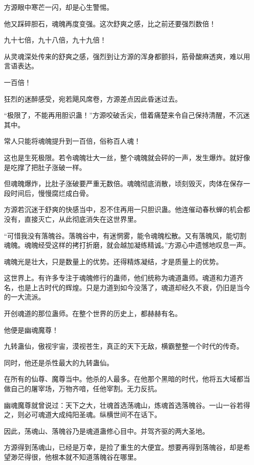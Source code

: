 \begin{this_body}
方源眼中寒芒一闪，却是心生警惕。

他又踩碎胆石，魂魄再度变强。这次舒爽之感，比之前还要强烈数倍！

九十七倍，九十八倍，九十九倍！

从灵魂深处传来的舒爽之感，强烈到让方源的浑身都颤抖，筋骨酸麻透爽，难以用言语表达。

一百倍！

狂烈的迷醉感受，宛若飓风席卷，方源差点因此昏迷过去。

“极限了，不能再用胆识蛊！”方源咬破舌尖，借着痛楚来令自己保持清醒，不沉迷其中。

常人只能将魂魄提升到一百倍，俗称百人魂！

这也是生死极限。若令魂魄壮大一丝，整个魂魄就会砰的一声，发生爆炸。就好像是吃撑了把肚子涨破一样。

但魂魄爆炸，比肚子涨破要严重无数倍。魂魄彻底消散，顷刻毁灭，肉体在保存一段时间后，慢慢腐烂成白骨。

方源若沉迷于舒爽的快感当中，忍不住再用一只胆识蛊。他连催动春秋蝉的机会都没有，直接灭亡，从此彻底消失在这世界里。

“可惜我没有落魄谷。落魄谷中，有迷惘雾，能令魂魄松散。又有落魄风，能切割魂魄。魂魄经受这样的拷打折磨，就会越加凝练精诚。”方源心中遗憾地叹息一声。

魂魄光是壮大，只是数量上的优势。还得精炼凝结，才是质量上的优势。

这世界上。有许多专注于魂魄修行的蛊师，他们统称为魂道蛊师。魂道和力道齐名，也是上古时代的辉煌。只是力道到如今没落了，魂道却经久不衰，仍旧是当今的一大流派。

开创魂道的那位蛊师。在整个世界的历史上，都赫赫有名。

他便是幽魂魔尊！

九转蛊仙，傲视宇宙，漠视苍生，真正的天下无敌，横霸整整一个时代的传奇。

同时，他还是杀性最大的九转蛊仙。

在所有的仙尊、魔尊当中。他杀的人最多。在他那个黑暗的时代，他将五大域都当做自己的屠宰场，万物齐喑，任他宰割。无力反抗。

幽魂魔尊就曾说过：天下之大，壮魂首选荡魂山，炼魂首选落魄谷。一山一谷若得之，则必可魂道大成纯阳圣魂。纵横世间不在话下。

因此，荡魂山、落魄谷乃是魂道蛊修心目中。并驾齐驱的两大圣地。

方源得到荡魂山，已经是万幸，是捡了重生的大便宜。想要再得到落魄谷，却是希望渺茫得很，他根本就不知道落魄谷在哪里。


\end{this_body}
